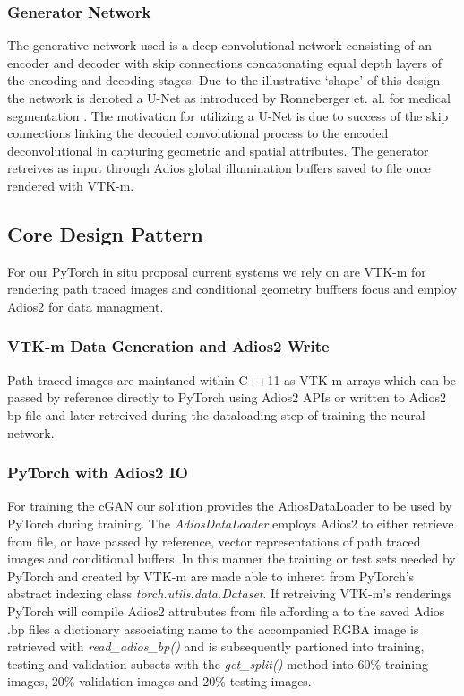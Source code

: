 \documentclass[sigconf,authordraft]{acmart}
\begin{document}
\subsubsection{Generator Network}

The generative network used is a deep convolutional network consisting of an encoder and decoder with skip connections concatonating equal depth layers of the encoding and decoding stages. Due to the illustrative `shape' of this design the network is denoted a U-Net as introduced by Ronneberger et. al. for medical segmentation \cite{ronnebergerUnet}. The motivation for utilizing a U-Net is due to success of the skip connections linking the decoded convolutional process to the encoded deconvolutional in capturing geometric and spatial attributes. The generator retreives as input through Adios global illumination buffers saved to file once rendered with VTK-m. 

\subsection{Core Design Pattern}

For our PyTorch in situ proposal current systems we rely on are VTK-m for rendering path traced images and conditional geometry buffters focus and employ Adios2 for data managment. 

\subsubsection{VTK-m Data Generation and Adios2 Write}

Path traced images are maintaned within C++11 as VTK-m arrays which can be passed by reference directly to PyTorch using Adios2 APIs or written to Adios2 bp file and later retreived during the dataloading step of training the neural network. 

\subsubsection{PyTorch with Adios2 IO}

For training the cGAN our solution provides the AdiosDataLoader to be used by PyTorch during training. The {\it AdiosDataLoader} employs Adios2 to either retrieve from file, or have passed by reference, vector representations of path traced images and conditional buffers. In this manner the training or test sets needed by PyTorch and created by VTK-m are made able to inheret from PyTorch's abstract indexing class {\it torch.utils.data.Dataset}. If retreiving VTK-m's renderings PyTorch will compile Adios2 attrubutes from file affording a  to the saved Adios .bp files a dictionary associating name to the accompanied RGBA image is retrieved with {\it read\_adios\_bp()} and is subsequently partioned into training, testing and validation subsets with the {\it get\_split()} method into 60\% training images, 20\% validation images and 20\% testing images.
 
\end{document}
